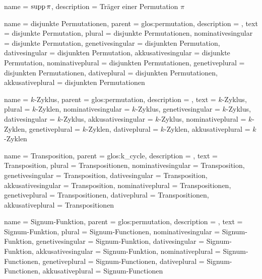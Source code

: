 {
    name        = {$\operatorname{supp} \pi$},
    description = {Träger einer Permutation $\pi$}
}

{
    name               = {disjunkte Permutationen},
    parent             = {glos:permutation},
    description        = {},
    text               = {disjunkte Permutation},
    plural             = {disjunkte Permutationen},
    nominativesingular = {disjunkte Permutation},
    genetivesingular   = {disjunkten Permutation},
    dativesingular     = {disjunkten Permutation},
    akkusativesingular = {disjunkte Permutation},
    nominativeplural   = {disjunkten Permutationen},
    genetiveplural     = {disjunkten Permutationen},
    dativeplural       = {disjunkten Permutationen},
    akkusativeplural   = {disjunkten Permutationen}
}

{
    name               = {$k$-Zyklus},
    parent             = {glos:permutation},
    description        = {},
    text               = {$k$-Zyklus},
    plural             = {$k$-Zyklen},
    nominativesingular = {$k$-Zyklus},
    genetivesingular   = {$k$-Zyklus},
    dativesingular     = {$k$-Zyklus},
    akkusativesingular = {$k$-Zyklus},
    nominativeplural   = {$k$-Zyklen},
    genetiveplural     = {$k$-Zyklen},
    dativeplural       = {$k$-Zyklen},
    akkusativeplural   = {$k$-Zyklen}
}

{
    name               = {Transposition},
    parent             = {glos:k_cycle},
    description        = {},
    text               = {Transposition},
    plural             = {Transpositionen},
    nominativesingular = {Transposition},
    genetivesingular   = {Transposition},
    dativesingular     = {Transposition},
    akkusativesingular = {Transposition},
    nominativeplural   = {Transpositionen},
    genetiveplural     = {Transpositionen},
    dativeplural       = {Transpositionen},
    akkusativeplural   = {Transpositionen}
}

{
    name               = {Signum-Funktion},
    parent             = {glos:permutation},
    description        = {},
    text               = {Signum-Funktion},
    plural             = {Signum-Functionen},
    nominativesingular = {Signum-Funktion},
    genetivesingular   = {Signum-Funktion},
    dativesingular     = {Signum-Funktion},
    akkusativesingular = {Signum-Funktion},
    nominativeplural   = {Signum-Functionen},
    genetiveplural     = {Signum-Functionen},
    dativeplural       = {Signum-Functionen},
    akkusativeplural   = {Signum-Functionen}
}